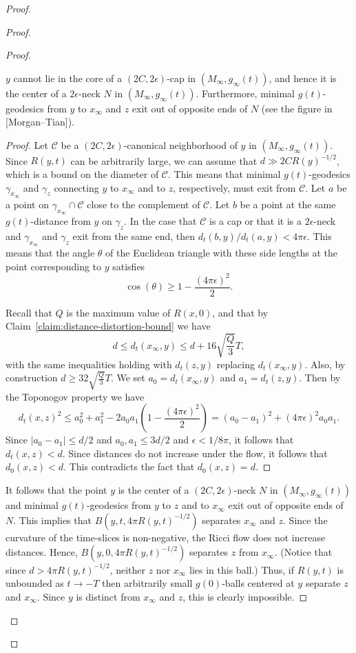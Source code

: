 \begin{proof}
\begin{proof}
\begin{proof}
\begin{claim}
\label{claim:neck-center-opposite-ends}
$y$ cannot lie in the core of a $(2C,2\epsilon)$-cap in
$(M_\infty,g_\infty(t))$, and hence it is the center of a
$2\epsilon$-neck $N$ in
$(M_\infty,g_\infty(t))$. Furthermore, minimal $g(t)$-geodesics from
$y$ to $x_\infty$ and $z$ exit out of opposite ends of $N$ (see the figure in [Morgan--Tian]).
\end{claim}


\begin{proof}
Let ${\mathcal C}$ be a $(2C,2\epsilon)$-canonical
neighborhood of $y$ in
$(M_\infty,g_\infty(t))$. Since $R(y,t)$ can be arbitrarily large,
we can assume that $d \gg 2CR(y)^{-1/2}$, which is a bound on the
diameter of ${\mathcal C}$. This means that minimal $g(t)$-geodesics
$\gamma_{x_\infty}$ and $\gamma_z$ connecting $y$ to $x_\infty$ and
to $z$, respectively, must exit from ${\mathcal C}$. Let $a$ be a
point on $\gamma_{x_\infty}\cap{\mathcal C}$ close to the complement
of ${\mathcal C}$. Let $b$ be a point at the same $g(t)$-distance
from $y$ on $\gamma_z$. In the case that  ${\mathcal C}$ is a cap
or that it is a $2\epsilon$-neck and $\gamma_{x_\infty}$ and
$\gamma_z$ exit from the same end, then
$d_t(b,y)/d_t(a,y)<4\pi\epsilon$. This means that the angle $\theta$
of the Euclidean triangle with these side lengths at the point
corresponding to $y$ satisfies
$$\cos(\theta)\ge 1-\frac{(4\pi\epsilon)^2}{2}.$$

Recall that $Q$ is the maximum value of $R(x,0)$,  and that by
Claim~\ref{claim:distance-distortion-bound} we have
 $$d\le d_t(x_\infty,y)\le d+16\sqrt{\frac{Q}{3}}T,$$
 with the same inequalities holding with $d_t(z,y)$ replacing $d_t(x_\infty,y)$.
 Also, by construction $d\ge 32\sqrt{\frac{Q}{3}}T$.
We set $a_0=d_t(x_\infty,y)$ and $a_1=d_t(z,y)$. Then by the
Toponogov property we have
$$d_t(x,z)^2\le a_0^2+a_1^2-2a_0a_1\left(
1-\frac{(4\pi\epsilon)^2}{2}\right)=(a_0-a_1)^2+(4\pi\epsilon)^2a_0a_1.$$
Since $|a_0-a_1|\le d/2$ and $a_0,a_1\le 3d/2$ and
$\epsilon<1/8\pi$, it follows that $d_t(x,z)<d$. Since distances do
not increase under the flow, it follows that $d_0(x,z)<d$. This
contradicts the fact that $d_0(x,z)=d$.
\end{proof}


It follows that  the point $y$ is the center of a
$(2C,2\epsilon)$-neck $N$ in $(M_\infty,g_\infty(t))$ and minimal
$g(t)$-geodesics from $y$ to $z$ and to $x_\infty$ exit out of
opposite ends of $N$. This implies that $B(y,t,4\pi R(y,t)^{-1/2})$
separates $x_\infty$ and $z$. Since the curvature of the time-slices
is non-negative, the Ricci flow does not increase distances. Hence,
$B(y,0,4\pi R(y,t)^{-1/2})$ separates $z$ from $x_\infty$. (Notice
that since $d>4\pi R(y,t)^{-1/2}$, neither $z$ nor $x_\infty$ lies
in this ball.) Thus, if  $R(y,t)$ is unbounded as $t\rightarrow -T$
then arbitrarily small $g(0)$-balls centered at $y$ separate $z$ and
$x_\infty$. Since $y$ is distinct from $x_\infty$ and $z$, this is
clearly impossible.
\end{proof}





\end{proof}
\end{proof}
